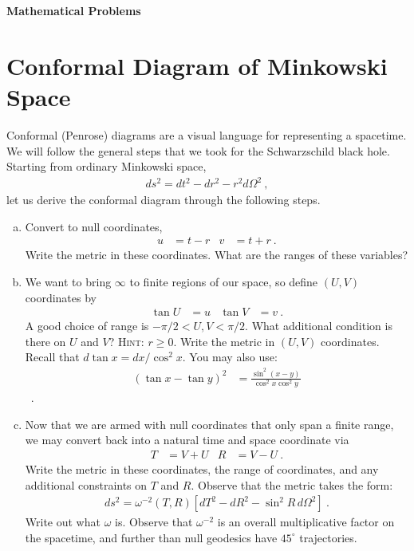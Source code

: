 \documentclass[12pt]{article}
\numberwithin{equation}{section}    %
\begin{document}
\vspace{2em}
{\Large\textbf{\textsf{Mathematical Problems}}}


\section{Conformal Diagram of Minkowski Space}

Conformal (Penrose) diagrams are a visual language for representing a spacetime. We will follow the general steps that we took for the Schwarzschild black hole. Starting from ordinary Minkowski space,
\begin{align}
	ds^2 = dt^2 - dr^2 - r^2 d\Omega^2 \ ,
\end{align}
let us derive the conformal diagram through the following steps.
\begin{enumerate}[(a)]
\item Convert to null coordinates,
\begin{align}
	u & = t-r
	&
	v &= t+r \ .
\end{align}	
Write the metric in these coordinates. What are the ranges of these variables?
\item We want to bring $\infty$ to finite regions of our space, so define $(U,V)$ coordinates by
\begin{align}
	\tan U &= u 
	&
	\tan V &= v \ .
\end{align}
A good choice of range is $-\pi/2 < U,V < \pi/2$. What additional condition is there on $U$ and $V$? \textsc{Hint}: $r\geq 0$. Write the metric in $(U,V)$ coordinates. Recall that $d\tan x = dx/\cos^2 x$. You may also use:
\begin{align}
	\left(\tan x - \tan y\right)^2
	&= \frac{\sin^2(x-y)}{\cos^2x \cos^2y}
\end{align} \ .
\item Now that we are armed with null coordinates that only span a finite range, we may convert back into a natural time and space coordinate via
\begin{align}
	T&= V+U & R&=V-U \ .
\end{align}
Write the metric in these coordinates, the range of coordinates, and any additional constraints on $T$ and $R$. Observe that the metric takes the form:
\begin{align}
	ds^2 = \omega^{-2}(T,R) \left[dT^2 - dR^2 - \sin^2 R \, d\Omega^2 \right] \ .
	\label{eq:mink:conf:flat}
\end{align}
Write out what $\omega$ is. Observe that $\omega^{-2}$ is an overall multiplicative factor on the spacetime, and further than null geodesics have $45^\circ$ trajectories.

\end{enumerate}
\end{document}

